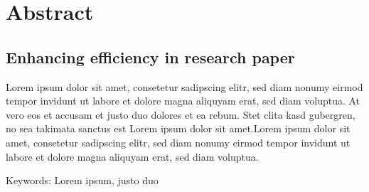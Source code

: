 \newpage
\section*{Abstract}

  \subsection*{Enhancing efficiency in research paper}

    Lorem ipsum dolor sit amet, consetetur sadipscing elitr, sed diam nonumy eirmod tempor invidunt ut labore et dolore magna aliquyam erat, sed diam voluptua.
    At vero eos et accusam et justo duo dolores et ea rebum. Stet clita kasd gubergren, no sea takimata sanctus est Lorem ipsum dolor sit amet.Lorem ipsum dolor sit amet, consetetur sadipscing elitr, sed diam nonumy eirmod tempor invidunt ut labore et dolore magna aliquyam erat, sed diam voluptua.
    
\vspace{0.5cm}

\noindent
Keywords: Lorem ipsum, justo duo